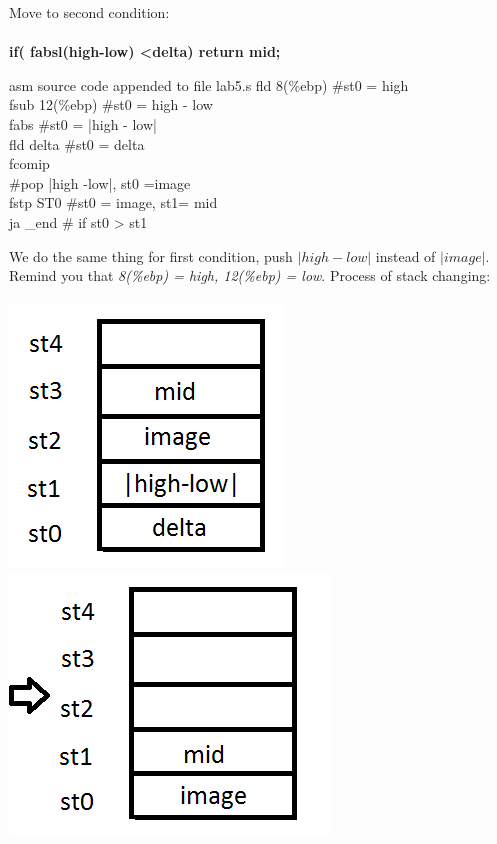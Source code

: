 \documentclass{article}
\begin{document}
\begin{multicols}{2}
Move to second condition: \\ \\ \textbf{if( fabsl(high-low) \textless delta) return mid;} \\
\begin{GFT}{asm source code appended to file lab5.s}
\+fld 8(\%ebp) 		\#st0 = high\\
\+fsub 12(\%ebp)		\#st0 = high - low\\
\+fabs			\#st0 = |high - low|\\
\+fld delta		\#st0 = delta\\
\+fcomip			\\
\+\#pop |high -low|, st0 =image\\
\+fstp ST0		\#st0 = image, st1= mid\\
\+ja \_end			\# if st0 > st1\\
\end{GFT}
We do the same thing for first condition, push $|high-low|$ instead of $|image|$. Remind you that \textit{8(\%ebp) = high, 12(\%ebp) = low}. Process of stack changing: \\ \\
\includegraphics[scale=0.5]{stack4.png}
\includegraphics[scale=0.5]{stack5.png} 

\end{multicols}
\end{document}
